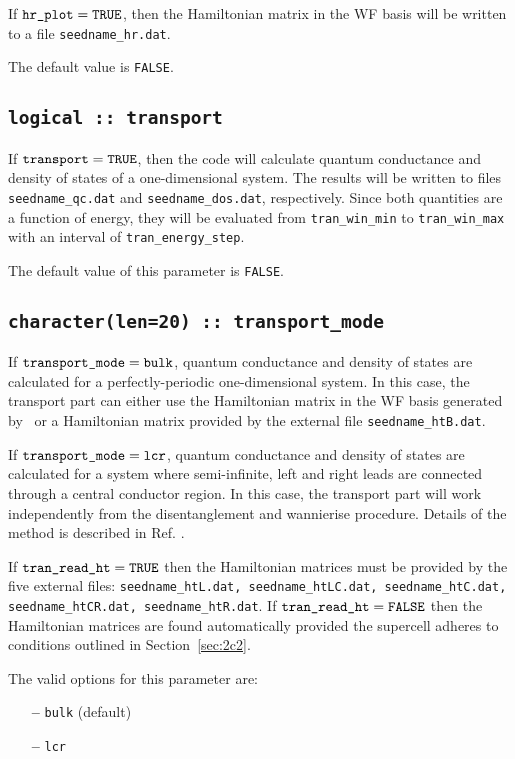 If $\verb#hr_plot#=\verb#TRUE#$, then the Hamiltonian matrix in the
WF basis will be written to a file {\tt seedname\_hr.dat}.

The default value is {\tt FALSE}.

\subsection[transport]{\tt logical :: transport}

If $\verb#transport#=\verb#TRUE#$, then the code will calculate
quantum conductance and density of states of a one-dimensional system.
The results will be written to files \verb#seedname_qc.dat#
and \verb#seedname_dos.dat#, respectively.
Since both quantities are a function of energy,
they will be evaluated from \verb#tran_win_min# to \verb#tran_win_max#
with an interval of \verb#tran_energy_step#.

The default value of this parameter is \verb#FALSE#.

\subsection[transport\_mode]{\tt character(len=20) :: transport\_mode}

If $\verb#transport_mode#=\verb#bulk#$, quantum conductance
and density of states are calculated for a perfectly-periodic one-dimensional system.
In this case, the transport part can either use 
the Hamiltonian matrix in the WF basis generated by \wannier\
or a Hamiltonian matrix provided by the external file
{\tt seedname\_htB.dat}.

If $\verb#transport_mode#=\verb#lcr#$,
quantum conductance and density of states are calculated 
for a system where semi-infinite, left and right leads
are connected through a central conductor region. 
In this case, the transport part will work independently from
the disentanglement and wannierise procedure. 
Details of the method is described in Ref. \cite{Nardelli}.

If $\verb#tran_read_ht# = \verb#TRUE#$ then the
Hamiltonian matrices must be provided by
the five external files:
{\tt seedname\_htL.dat, seedname\_htLC.dat, seedname\_htC.dat,
seedname\_htCR.dat, seedname\_htR.dat}.
If $\verb#tran_read_ht# = \verb#FALSE#$ then the Hamiltonian
matrices are found automatically provided the supercell adheres to 
conditions outlined in Section~\ref{sec:2c2}.

The valid options for this parameter are:
\begin{itemize}
\item[{\bf --}] \verb#bulk#  (default)
\item[{\bf --}] \verb#lcr# 
\end{itemize}

